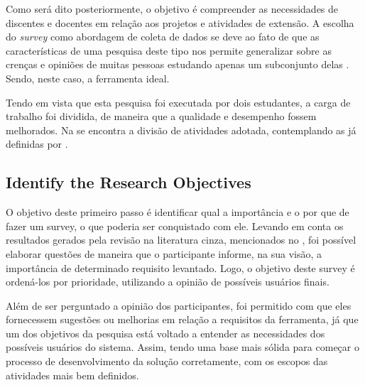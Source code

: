 Como será dito posteriormente, o objetivo é compreender as necessidades de discentes e docentes em relação aos projetos e atividades de extensão. 
A escolha do \textit{survey} como abordagem de coleta de dados se deve ao fato de que as características de uma pesquisa deste tipo nos permite generalizar sobre as crenças e opiniões de muitas pessoas estudando apenas um subconjunto delas \cite{kasunic2005designing}. 
Sendo, neste caso, a ferramenta ideal.


Tendo em vista que esta pesquisa foi executada por dois estudantes, a carga de trabalho foi dividida, de maneira que a qualidade e desempenho fossem melhorados. 
Na  se encontra a divisão de atividades adotada, contemplando as já definidas por .




\subsection{Identify the Research Objectives} \label{sec:survey-objectives}

O objetivo deste primeiro passo é identificar qual a importância e o por que de fazer um survey, o que poderia ser conquistado com ele.
Levando em conta os resultados gerados pela revisão na literatura cinza, mencionados no , foi possível elaborar questões de maneira que o participante informe, na sua visão, a importância de determinado requisito levantado. 
Logo, o objetivo deste survey é ordená-los por prioridade, utilizando a opinião de possíveis usuários finais.

Além de ser perguntado a opinião dos participantes, foi permitido com que eles fornecessem sugestões ou melhorias em relação a requisitos da ferramenta, já que um dos objetivos da pesquisa está voltado a entender as necessidades dos possíveis usuários do sistema. 
Assim, tendo uma base mais sólida para começar o processo de desenvolvimento da solução corretamente, com os escopos das atividades mais bem definidos.

